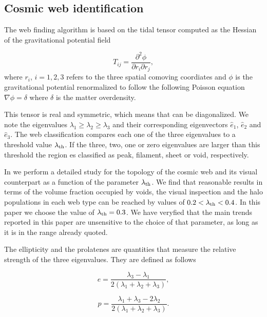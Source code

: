 \documentclass{emulateapj}
\begin{document}
\subsection{Cosmic web identification}
The web finding algorithm is based on the tidal tensor computed as the
Hessian of the  gravitational potential field

\begin{equation}
T_{ij} = \frac{\partial^2 \phi}{\partial r_i \partial r_j}, 
\end{equation}
where $r_{i}$, $i=1,2,3$ refers to the three spatial comoving
coordiates and $\phi$ is the gravitational potential renormalized to
follow the following Poisson equation $\nabla\phi=\delta$ where
$\delta$ is the matter overdensity.  

This tensor is real and symmetric, which means that can be
diagonalized. We note the eigenvalues $\lambda_1\geq \lambda_2\geq
\lambda_3$ and their corresponding eigenvectors $\hat{e}_1$,
$\hat{e}_2$ and $\hat{e}_3$. The web classification compares each one
of the three eigenvalues to a threshold value $\lambda_{\rm th}$. If the three, two, one or zero eigenvalues are larger than this threshold the region es classified as peak, filament, sheet or void, respectively. 

In \cite{Tweb} we perform a detailed study for the topology of the
cosmic web and its visual counterpart as a function of the parameter
$\lambda_{\rm th}$. We find that reasonable results in terms of the
volume fraction occupied by voids, the visual inspection and the halo
populations in each web type can be reached by values of $0.2<\lambda_{\rm
th}<0.4$. In this paper we choose the value of $\lambda_{\rm
  th}=0.3$. We have veryfied that the main trends reported in this
paper are unsensitive to the choice of that parameter, as long as it
is in the range already quoted.


The ellipticity and the prolatenes are quantities that measure the
relative strength of the three eigenvalues. They are defined as
follows

\begin{equation}
e= \frac{\lambda_3 - \lambda_1}{2(\lambda_1 + \lambda_2 + \lambda_3)}, 
\end{equation}

\begin{equation}
p= \frac{\lambda_1 + \lambda_3 - 2\lambda_2}{2(\lambda_1 + \lambda_2 +
  \lambda_3)}.
\end{equation}
\end{document}
